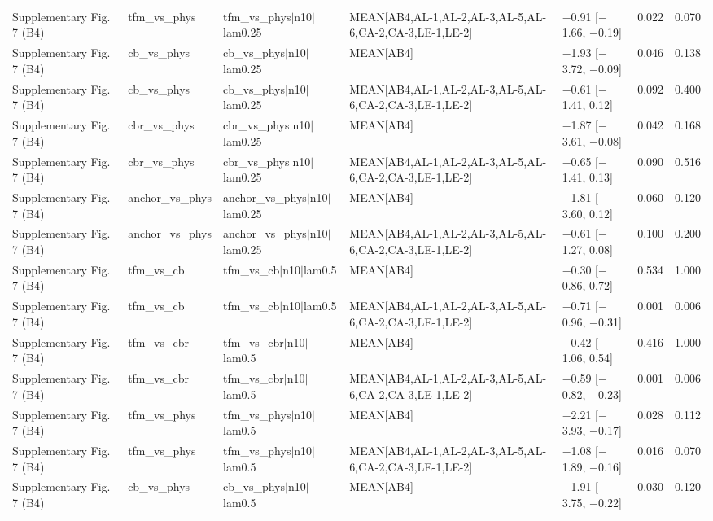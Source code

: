 \begin{longtable}{lllllrr}
Supplementary Fig. 7 (B4) & tfm\_vs\_phys & tfm\_vs\_phys$|$n10$|$lam0.25 & MEAN[AB4,AL-1,AL-2,AL-3,AL-5,AL-6,CA-2,CA-3,LE-1,LE-2] & $-$0.91 [$-$1.66, $-$0.19] & 0.022 & 0.070 \\
Supplementary Fig. 7 (B4) & cb\_vs\_phys & cb\_vs\_phys$|$n10$|$lam0.25 & MEAN[AB4] & $-$1.93 [$-$3.72, $-$0.09] & 0.046 & 0.138 \\
Supplementary Fig. 7 (B4) & cb\_vs\_phys & cb\_vs\_phys$|$n10$|$lam0.25 & MEAN[AB4,AL-1,AL-2,AL-3,AL-5,AL-6,CA-2,CA-3,LE-1,LE-2] & $-$0.61 [$-$1.41, 0.12] & 0.092 & 0.400 \\
Supplementary Fig. 7 (B4) & cbr\_vs\_phys & cbr\_vs\_phys$|$n10$|$lam0.25 & MEAN[AB4] & $-$1.87 [$-$3.61, $-$0.08] & 0.042 & 0.168 \\
Supplementary Fig. 7 (B4) & cbr\_vs\_phys & cbr\_vs\_phys$|$n10$|$lam0.25 & MEAN[AB4,AL-1,AL-2,AL-3,AL-5,AL-6,CA-2,CA-3,LE-1,LE-2] & $-$0.65 [$-$1.41, 0.13] & 0.090 & 0.516 \\
Supplementary Fig. 7 (B4) & anchor\_vs\_phys & anchor\_vs\_phys$|$n10$|$lam0.25 & MEAN[AB4] & $-$1.81 [$-$3.60, 0.12] & 0.060 & 0.120 \\
Supplementary Fig. 7 (B4) & anchor\_vs\_phys & anchor\_vs\_phys$|$n10$|$lam0.25 & MEAN[AB4,AL-1,AL-2,AL-3,AL-5,AL-6,CA-2,CA-3,LE-1,LE-2] & $-$0.61 [$-$1.27, 0.08] & 0.100 & 0.200 \\
Supplementary Fig. 7 (B4) & tfm\_vs\_cb & tfm\_vs\_cb$|$n10$|$lam0.5 & MEAN[AB4] & $-$0.30 [$-$0.86, 0.72] & 0.534 & 1.000 \\
Supplementary Fig. 7 (B4) & tfm\_vs\_cb & tfm\_vs\_cb$|$n10$|$lam0.5 & MEAN[AB4,AL-1,AL-2,AL-3,AL-5,AL-6,CA-2,CA-3,LE-1,LE-2] & $-$0.71 [$-$0.96, $-$0.31] & 0.001 & 0.006 \\
Supplementary Fig. 7 (B4) & tfm\_vs\_cbr & tfm\_vs\_cbr$|$n10$|$lam0.5 & MEAN[AB4] & $-$0.42 [$-$1.06, 0.54] & 0.416 & 1.000 \\
Supplementary Fig. 7 (B4) & tfm\_vs\_cbr & tfm\_vs\_cbr$|$n10$|$lam0.5 & MEAN[AB4,AL-1,AL-2,AL-3,AL-5,AL-6,CA-2,CA-3,LE-1,LE-2] & $-$0.59 [$-$0.82, $-$0.23] & 0.001 & 0.006 \\
Supplementary Fig. 7 (B4) & tfm\_vs\_phys & tfm\_vs\_phys$|$n10$|$lam0.5 & MEAN[AB4] & $-$2.21 [$-$3.93, $-$0.17] & 0.028 & 0.112 \\
Supplementary Fig. 7 (B4) & tfm\_vs\_phys & tfm\_vs\_phys$|$n10$|$lam0.5 & MEAN[AB4,AL-1,AL-2,AL-3,AL-5,AL-6,CA-2,CA-3,LE-1,LE-2] & $-$1.08 [$-$1.89, $-$0.16] & 0.016 & 0.070 \\
Supplementary Fig. 7 (B4) & cb\_vs\_phys & cb\_vs\_phys$|$n10$|$lam0.5 & MEAN[AB4] & $-$1.91 [$-$3.75, $-$0.22] & 0.030 & 0.120 \\

\end{longtable}
